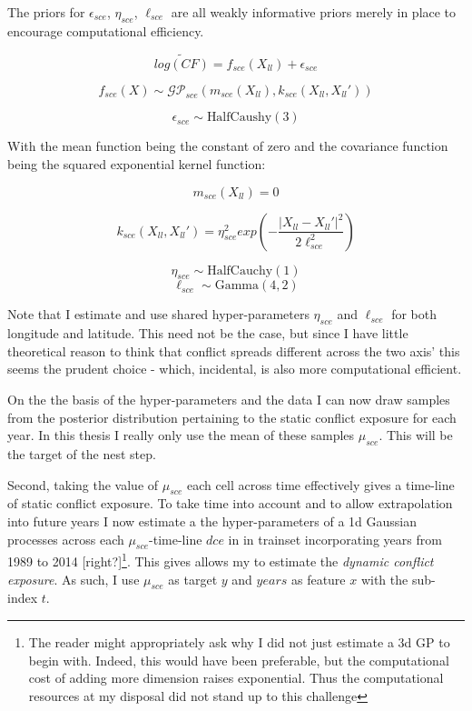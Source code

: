\documentclass[a4paper]{article}
\begin{document}
The priors for $\epsilon_{sce}$, $\eta_{sce}$, $\ell_{sce}$ are all weakly informative priors merely in place to encourage computational efficiency.\par

\[
\widetilde{log(CF)} = f_{sce}(X_{ll}) + \epsilon_{sce}
\]

\[
f_{sce}(X) \sim \mathcal{GP}_{sce}(m_{sce}(X_{ll}),k_{sce}(X_{ll},X_{ll}')) %
\]

\[
\epsilon_{sce} \sim \text{HalfCaushy}(3)
\]

With the mean function being the constant of zero and the covariance function being the squared exponential kernel function:

\[
m_{sce}(X_{ll}) = 0
\]

\[
k_{sce}(X_{ll},X_{ll}') = \eta_{sce}^2 exp\left(-\frac{|X_{ll}-X_{ll}'|^2}{2\ell_{sce}^2}\right) %
\]

\[
\eta_{sce} \sim \text{HalfCauchy}(1)
\]
\[
\ell_{sce} \sim \text{Gamma}(4,2)
\]


Note that I estimate and use shared hyper-parameters $\eta_{sce}$ and $\ell_{sce}$ for both longitude and latitude. This need not be the case, but since I have little theoretical reason to think that conflict spreads different across the two axis' this seems the prudent choice - which, incidental, is also more computational efficient.\par

On the the basis of the hyper-parameters and the data I can now draw samples from the posterior distribution pertaining to the static conflict exposure for each year. In this thesis I really only use the mean of these samples $\mu_{sce}$. This will be the target of the nest step.\par


Second, taking the value of $\mu_{sce}$ each cell across time effectively gives a time-line of static conflict exposure. To take time into account and to allow extrapolation into future years I now estimate a the hyper-parameters of a 1d Gaussian processes across each $\mu_{sce}$-time-line $dce$ in in trainset incorporating years from 1989 to 2014 [right?]\footnote{The reader might appropriately ask why I did not just estimate a 3d GP to begin with. Indeed, this would have been preferable, but the computational cost of adding more dimension raises exponential. Thus the computational resources at my disposal did not stand up to this challenge}. This gives allows my to estimate the \emph{dynamic conflict exposure}. As such, I use $\mu_{sce}$ as target $y$ and $years$ as feature $x$ with the sub-index $t$.\par
\end{document}
